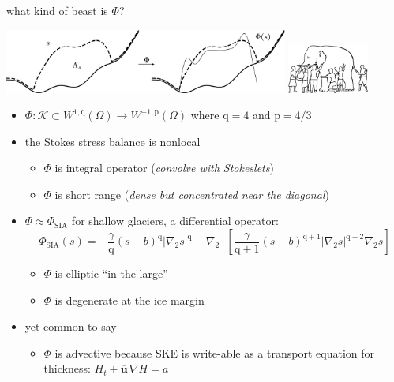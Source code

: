 \documentclass[usepdftitle=false,usenames,dvipsnames]{beamer}
\newcommand{\grad}{\nabla}
\newcommand{\bu}{\mathbf{u}}
\newcommand{\pp}{{\text{p}}}
\newcommand{\qq}{{\text{q}}}
\begin{document}
\begin{frame}{what kind of beast is $\Phi$?}

\begin{center}
\includegraphics[width=0.7\textwidth]{figs/idoaction.png} \hfill \includegraphics[width=0.2\textwidth]{figs/elephant.png}
\end{center}

\begin{itemize}
\small
\item $\Phi : \mathcal{K} \subset W^{1,\qq}(\Omega) \to W^{-1,\pp}(\Omega)$ where $\qq=4$ and $\pp=4/3$
\item the Stokes stress balance is nonlocal
    \begin{itemize}
    \item $\Phi$ is integral operator (\emph{convolve with Stokeslets})
    \item $\Phi$ is short range (\emph{dense but concentrated near the diagonal})
    \end{itemize}
\item $\Phi \approx \Phi_{\text{SIA}}$ for shallow glaciers, a differential operator:
    $$\Phi_{\text{SIA}}(s) = - \frac{\gamma}{\qq} (s-b)^{\qq} |\grad_2 s|^{\qq} - \grad_2 \cdot\left[\frac{\gamma}{\qq+1} (s-b)^{\qq+1} |\grad_2 s|^{\qq-2} \grad_2 s\right]$$

    \begin{itemize}
    \item $\Phi$ is elliptic ``in the large''
    \item $\Phi$ is degenerate at the ice margin
    \end{itemize}
\item yet common to say
    \begin{itemize}
    \item $\Phi$ is advective because SKE is write-able as a transport equation for thickness: $H_t + \overline{\bu}\, \grad H = a$
    \end{itemize}
\end{itemize}
\end{frame}
\end{document}
